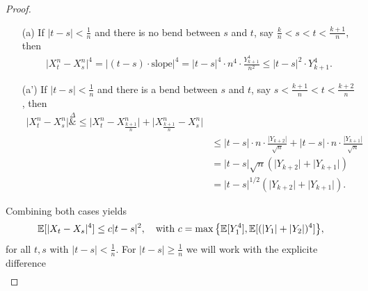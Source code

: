\begin{proof}[Proof]
\begin{itemize}
				\item[(a)] If $|t-s|<\frac{1}{n}$ and there is no bend between $s$ and $t$, say $\frac{k}{n}<s<t<\frac{k+1}{n}$, then
    			\begin{align*}
    				\lvert X_t^n - X_s^n \rvert^4 = \lvert (t - s)\cdot \text{slope} \rvert^4 = \lvert t - s\rvert^4 \cdot n^4 \cdot \frac{Y_{k+1}^4}{n^2} \leq \lvert t - s \rvert^2\cdot  Y_{k+1}^4.
				\end{align*}
				\item[(a')] If $|t-s|<\frac{1}{n}$ and there is a bend between $s$ and $t$, say $s<\frac{k+1}{n}<t<\frac{k+2}{n}$, then
				\begin{align*}
					\lvert X_t^n - X_s^n \rvert 
					\overset{\Delta}&{\leq} \big|X_t^n-X^n_{\frac{k+1}{n}}\big|+\big|X^n_{\frac{k+1}{n}}-X_s^n\big|\\					
						&\leq \lvert t -s \rvert \cdot n \cdot \frac{\lvert Y_{k+2}\rvert}{\sqrt{n}} + \lvert t -s \rvert \cdot n \cdot \frac{\lvert Y_{k+1}\rvert}{\sqrt{n}} \\
						&= \lvert t -s \rvert \sqrt{n} \left( \lvert Y_{k+2}\rvert + \lvert Y_{k+1}\rvert\right)\\
						&= \lvert t -s \rvert^{1/2} \left( \lvert Y_{k+2}\rvert + \lvert Y_{k+1}\rvert\right).
				\end{align*}
			\end{itemize}
			Combining both cases yields
			\begin{align*}
				\mathbb{E}[|X_t-X_s|^4]\leq c|t-s|^2,\quad \text{with } c=\max\big\{\mathbb{E}[Y_1^4], \mathbb{E}[(|Y_1|+|Y_2|)^4]\big\},
			\end{align*}
			for all $t,s$ with $|t-s|<\frac{1}{n}$.	
			For $|t-s|\geq \frac{1}{n}$ we will work with the explicite difference
			\begin{align}\label{yellow_box}

\end{align}
\end{proof}
